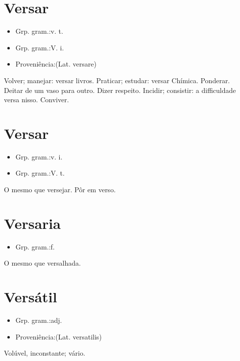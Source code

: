 \documentclass{article}
\begin{document}
\section{Versar}
\begin{itemize}
\item {Grp. gram.:v. t.}
\end{itemize}
\begin{itemize}
\item {Grp. gram.:V. i.}
\end{itemize}
\begin{itemize}
\item {Proveniência:(Lat. \textunderscore versare\textunderscore )}
\end{itemize}
Volver; manejar: \textunderscore versar livros\textunderscore .
Praticar; estudar: \textunderscore versar Chímica\textunderscore .
Ponderar.
Deitar de um vaso para outro.
Dizer respeito.
Incidir; consistir: \textunderscore a difficuldade versa nisso\textunderscore .
Conviver.
\section{Versar}
\begin{itemize}
\item {Grp. gram.:v. i.}
\end{itemize}
\begin{itemize}
\item {Grp. gram.:V. t.}
\end{itemize}
O mesmo que \textunderscore versejar\textunderscore .
Pôr em verso.
\section{Versaria}
\begin{itemize}
\item {Grp. gram.:f.}
\end{itemize}
O mesmo que \textunderscore versalhada\textunderscore .
\section{Versátil}
\begin{itemize}
\item {Grp. gram.:adj.}
\end{itemize}
\begin{itemize}
\item {Proveniência:(Lat. \textunderscore versatilis\textunderscore )}
\end{itemize}
Volúvel, inconstante; vário.
\end{document}
